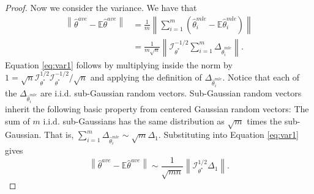 \documentclass[twoside]{article}
\DeclareMathOperator*{\subG}{subG}
\newcommand{\zero}{\text{\textbf{0}}}
\newcommand{\E}{\mathbb{E}}
\newcommand{\w}{\theta}
\newcommand{\wave}{\hat\w^{ave}}
\newcommand{\wmle}{\hat\w^{mle}}
\newcommand{\wstar}{{\w^{*}}}
\newcommand{\I}{\mathcal I}
\newcommand{\normal}[2]{\ensuremath{\mathcal{N}\left({{#1}},{{#2}}\right)}}
\newcommand{\subnormal}[1]{\ensuremath{\subG\left({{#1}}\right)}}
\newcommand{\ltwobig}[1]{{\left\lVert {#1} \right\rVert}}
\begin{document}
\begin{proof}
Now we consider the variance.
We have that
\begin{align}
\ltwobig{\wave-\E\wave}
&=
\frac{1}{m}\ltwobig{\sum_{i=1}^m\left(\wmle_i-\E\wmle_i\right)}
\\&=
\frac{1}{m\sqrt{n}}\ltwobig{\I^{-1/2}_\wstar\sum_{i=1}^m\Delta_{\wmle_i}}
\label{eq:var1}
.
\end{align}
Equation \ref{eq:var1} follows by multiplying inside the norm by $1=\sqrt{n}\I_{\wstar}^{1/2}\I_{\wstar}^{-1/2}/\sqrt{n}$ and applying the definition of $\Delta_{\wmle_i}$.
Notice that each of the $\Delta_{\wmle_i}$ are i.i.d. sub-Gaussian random vectors.
Sub-Gaussian random vectors inherit the following basic property from centered Gaussian random vectors:
The sum of $m$ i.i.d. sub-Gaussians has the same distribution as $\sqrt{m}$ times the sub-Gaussian.
That is, $\sum_{i=1}^m \Delta_{\wmle_i} \sim \sqrt{m}\Delta_1$.
Substituting into Equation \ref{eq:var1} gives
\begin{equation}
\ltwobig{\wave-\E\wave}
\sim
\frac{1}{\sqrt{mn}}\ltwobig{\I^{1/2}_\wstar\Delta_1}
.
\label{eq:var2}
\end{equation}


\end{proof}
\end{document}
